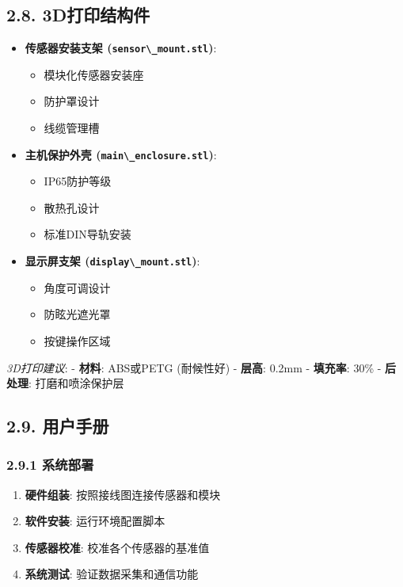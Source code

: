 \subsection{2.8. 3D打印结构件}\label{dux6253ux5370ux7ed3ux6784ux4ef6}

\begin{itemize}
\tightlist
\item
  \textbf{传感器安装支架 (\passthrough{\lstinline!sensor\_mount.stl!})}:

  \begin{itemize}
  \tightlist
  \item
    模块化传感器安装座
  \item
    防护罩设计
  \item
    线缆管理槽
  \end{itemize}
\item
  \textbf{主机保护外壳 (\passthrough{\lstinline!main\_enclosure.stl!})}:

  \begin{itemize}
  \tightlist
  \item
    IP65防护等级
  \item
    散热孔设计
  \item
    标准DIN导轨安装
  \end{itemize}
\item
  \textbf{显示屏支架 (\passthrough{\lstinline!display\_mount.stl!})}:

  \begin{itemize}
  \tightlist
  \item
    角度可调设计
  \item
    防眩光遮光罩
  \item
    按键操作区域
  \end{itemize}
\end{itemize}

\emph{3D打印建议}: - \textbf{材料}: ABS或PETG (耐候性好) -
\textbf{层高}: 0.2mm - \textbf{填充率}: 30\% - \textbf{后处理}:
打磨和喷涂保护层

\subsection{2.9. 用户手册}\label{ux7528ux6237ux624bux518c}

\subsubsection{2.9.1 系统部署}\label{ux7cfbux7edfux90e8ux7f72}

\begin{enumerate}
\def\labelenumi{\arabic{enumi}.}
\tightlist
\item
  \textbf{硬件组装}: 按照接线图连接传感器和模块
\item
  \textbf{软件安装}: 运行环境配置脚本
\item
  \textbf{传感器校准}: 校准各个传感器的基准值
\item
  \textbf{系统测试}: 验证数据采集和通信功能
\end{enumerate}

